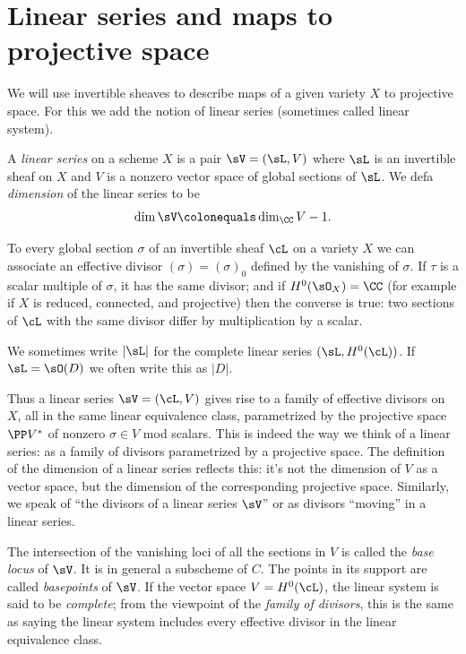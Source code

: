 \section{Linear series and maps to projective space}

We will use invertible sheaves to  describe maps of a given variety $X$ to projective space. For this we add the notion of linear series (sometimes called linear system).
%
%

\begin{definition}
 A \emph{linear series} on a scheme $X$ is a pair $\sV  = (\sL, V)$ where $\sL$ is an invertible sheaf  on $X$ and
 $V$ is a nonzero vector space of global sections of $\sL$. We defa
\emph{dimension}
%
of the linear series to be
 $$
 \dim \sV \colonequals \dim_\CC V -1.
 $$
  \end{definition}

To every global section $\sigma$ of an invertible sheaf $\cL$ on a variety $X$  we can associate an effective divisor $(\sigma) = (\sigma)_0$ defined by the vanishing of $\sigma$. If $\tau$ is a scalar multiple of $\sigma$, it has the same divisor; and if
 $H^0(\sO_X) = \CC$ (for example if $X$ is reduced, connected, and
 projective) then the converse is true: two sections of $\cL$ with the same divisor differ by multiplication by a scalar.

 We sometimes write
 $|\sL|$ for the complete linear series $(\sL, H^0(\cL))$. If
$\sL = \sO(D)$
%
 we often write this as $|D|$.

Thus a linear series $\sV = (\cL, V)$ gives rise to a family of
effective divisors on $X$, all in the same linear equivalence class,
parametrized by the projective space $\PP V^*$
of nonzero $\sigma \in V$ mod scalars.
This is indeed the way
we think of a linear series: as a family of divisors parametrized by a
projective space.
The definition of the dimension
of a linear series
reflects this:
it's not the dimension of $V$ as a vector
space, but the dimension of the corresponding projective space.
Similarly, we speak
 of ``the divisors of
a linear series $\sV$'' or as divisors ``moving'' in a linear series.

The intersection of the vanishing loci of all the sections in $V$ is
%
called the \emph{base locus} of $\sV$. It is in general a subscheme of
$C$. The points in its support are called \emph{basepoints} of $\sV$.
If the vector space $V = H^0(\cL)$, the linear system is said to be
%
\emph{complete};
from the viewpoint
of the \emph{family of divisors},
%
this is the same as saying the linear system includes every
effective divisor in the linear equivalence class.


